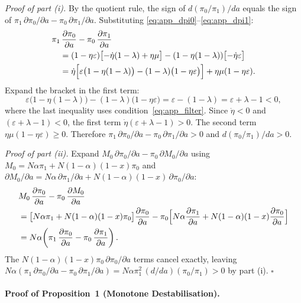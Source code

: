 \documentclass{article}
\begin{document}
\noindent\textit{Proof of part (i).}
By the quotient rule, the sign of $d(\pi_0/\pi_1)/da$ equals the sign of $\pi_1\,\partial\pi_0/\partial a - \pi_0\,\partial\pi_1/\partial a$.
Substituting \eqref{eq:app_dpi0}--\eqref{eq:app_dpi1}:
\begin{align*}
  &\pi_1\,\frac{\partial\pi_0}{\partial a} - \pi_0\,\frac{\partial\pi_1}{\partial a} \\
  &\quad= (1-\eta\varepsilon)\bigl[-\dot\eta(1-\lambda)+\eta\mu\bigr]
    - (1-\eta(1-\lambda))\bigl[-\dot\eta\varepsilon\bigr] \\
  &\quad= \dot\eta\Bigl[\varepsilon\bigl(1-\eta(1-\lambda)\bigr)
          - (1-\lambda)\bigl(1-\eta\varepsilon\bigr)\Bigr]
       + \eta\mu(1-\eta\varepsilon).
\end{align*}
Expand the bracket in the first term:
\[
  \varepsilon\bigl(1-\eta(1-\lambda)\bigr) - (1-\lambda)\bigl(1-\eta\varepsilon\bigr)
  = \varepsilon - (1-\lambda)
  = \varepsilon + \lambda - 1 < 0,
\]
where the last inequality uses condition~\eqref{eq:app_filter}.
Since $\dot\eta < 0$ and $(\varepsilon+\lambda-1) < 0$, the first term $\dot\eta(\varepsilon+\lambda-1) > 0$.
The second term $\eta\mu(1-\eta\varepsilon) \geq 0$.
Therefore $\pi_1\,\partial\pi_0/\partial a - \pi_0\,\partial\pi_1/\partial a > 0$ and $d(\pi_0/\pi_1)/da > 0$.

\medskip\noindent\textit{Proof of part (ii).}
Expand $M_0\,\partial\pi_0/\partial a - \pi_0\,\partial M_0/\partial a$ using $M_0 = N\alpha\pi_1 + N(1-\alpha)(1-x)\pi_0$ and $\partial M_0/\partial a = N\alpha\,\partial\pi_1/\partial a + N(1-\alpha)(1-x)\,\partial\pi_0/\partial a$:
\begin{align*}
  &M_0\,\frac{\partial\pi_0}{\partial a} - \pi_0\,\frac{\partial M_0}{\partial a} \\
  &= \bigl[N\alpha\pi_1 + N(1-\alpha)(1-x)\pi_0\bigr]\frac{\partial\pi_0}{\partial a}
     - \pi_0\Bigl[N\alpha\frac{\partial\pi_1}{\partial a}
       + N(1-\alpha)(1-x)\frac{\partial\pi_0}{\partial a}\Bigr] \\
  &= N\alpha\!\left(\pi_1\,\frac{\partial\pi_0}{\partial a}
     - \pi_0\,\frac{\partial\pi_1}{\partial a}\right).
\end{align*}
The $N(1-\alpha)(1-x)\pi_0\,\partial\pi_0/\partial a$ terms cancel exactly, leaving $N\alpha(\pi_1\,\partial\pi_0/\partial a - \pi_0\,\partial\pi_1/\partial a) = N\alpha\pi_1^2\,(d/da)(\pi_0/\pi_1) > 0$ by part (i).
\hfill$\square$

\bigskip

\paragraph{Proof of Proposition~1 (Monotone Destabilisation).}
\end{document}
